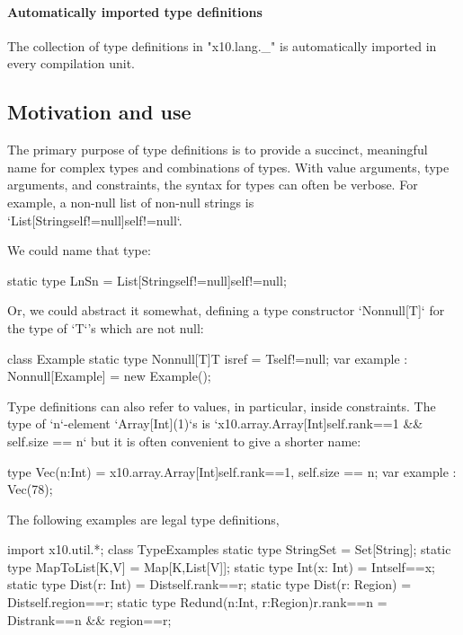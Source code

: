 \paragraph{Automatically imported type definitions}
\label{X10LangUnderscore}

The collection of type definitions in
\xcdmath"x10.lang._" is automatically imported in every compilation unit.


\subsection{Motivation and use}
The primary purpose of type definitions is to provide a succinct,
meaningful name for complex types
and combinations of types. 
With value arguments, type arguments, and constraints, the syntax for \Xten{}
types can often be verbose. 
For example, a non-null list of non-null strings is \\
\xcd`List[String{self!=null}]{self!=null}`.

We could name that type: 
% 
\begin{xten}
static type LnSn = List[String{self!=null}]{self!=null};
\end{xten}
Or, we could abstract it somewhat, defining a type constructor
\xcd`Nonnull[T]` for the type of \xcd`T`'s which are not null:
% 
\begin{xten}
class Example {
  static type Nonnull[T]{T isref}  = T{self!=null};
  var example : Nonnull[Example] = new Example();
}
\end{xten}
%

Type definitions can also refer to values, in particular, inside 
constraints.  The type of \xcd`n`-element \xcd`Array[Int](1)`s  is 
\xcd`x10.array.Array[Int]{self.rank==1 && self.size == n}`
but it is often convenient to give a shorter name: 
\begin{xten}
type Vec(n:Int) = x10.array.Array[Int]{self.rank==1, self.size == n}; 
var example : Vec(78); 
\end{xten}

%
The following examples are legal type definitions, 
% 
\begin{xten}
import x10.util.*;
class TypeExamples {
  static type StringSet = Set[String];
  static type MapToList[K,V] = Map[K,List[V]];
  static type Int(x: Int) = Int{self==x};
  static type Dist(r: Int) = Dist{self.rank==r};
  static type Dist(r: Region) = Dist{self.region==r};
  static type Redund(n:Int, r:Region){r.rank==n} 
      = Dist{rank==n && region==r};
}
\end{xten}
% 

